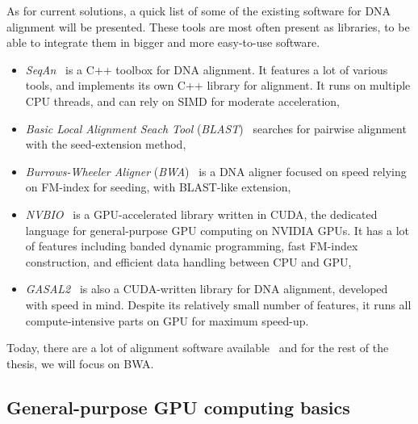 As for current solutions, a quick list of some of the existing software for DNA alignment will be presented. These tools are most often present as libraries, to be able to integrate them in bigger and more easy-to-use software.

\begin{itemize}
    \item \emph{SeqAn}~\cite{Doring:seqan} is a C++ toolbox for DNA alignment. It features a lot of various tools, and implements its own C++ library for alignment. It runs on multiple CPU threads, and can rely on SIMD for moderate acceleration,
    \item \emph{Basic Local Alignment Seach Tool} (\emph{BLAST})~\cite{Altschul:BLAST} searches for pairwise alignment with the seed-extension method,
    \item \emph{Burrows-Wheeler Aligner} (\emph{BWA})~\cite{li:bwa} is a DNA aligner focused on speed relying on FM-index for seeding, with BLAST-like extension,
    \item \emph{NVBIO}~\cite{nvidia:nvbio} is a GPU-accelerated library written in CUDA, the dedicated language for general-purpose GPU computing on NVIDIA GPUs. It has a lot of features including banded dynamic programming, fast FM-index construction, and efficient data handling between CPU and GPU,
    \item \emph{GASAL2}~\cite{Ahmed:gasal2} is also a CUDA-written library for DNA alignment, developed with speed in mind. Despite its relatively small number of features, it runs all compute-intensive parts on GPU for maximum speed-up.
\end{itemize}

Today, there are a lot of alignment software available~\cite{wiki:ListAlignmentSoft} and for the rest of the thesis, we will focus on BWA.

\subsection{General-purpose GPU computing basics}


